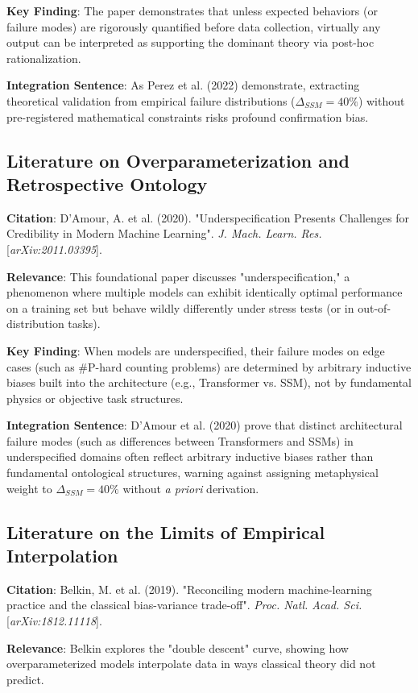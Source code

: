 \documentclass{article}
\begin{document}
\textbf{Key Finding}: The paper demonstrates that unless expected behaviors (or failure modes) are rigorously quantified before data collection, virtually any output can be interpreted as supporting the dominant theory via post-hoc rationalization.

\textbf{Integration Sentence}: As Perez et al. (2022) demonstrate, extracting theoretical validation from empirical failure distributions ($\Delta_{SSM} = 40\%$) without pre-registered mathematical constraints risks profound confirmation bias.

\subsection{Literature on Overparameterization and Retrospective Ontology}
\textbf{Citation}: D'Amour, A. et al. (2020). "Underspecification Presents Challenges for Credibility in Modern Machine Learning". \textit{J. Mach. Learn. Res.} [\textit{arXiv:2011.03395}].

\textbf{Relevance}: This foundational paper discusses "underspecification," a phenomenon where multiple models can exhibit identically optimal performance on a training set but behave wildly differently under stress tests (or in out-of-distribution tasks).

\textbf{Key Finding}: When models are underspecified, their failure modes on edge cases (such as \#P-hard counting problems) are determined by arbitrary inductive biases built into the architecture (e.g., Transformer vs. SSM), not by fundamental physics or objective task structures.

\textbf{Integration Sentence}: D'Amour et al. (2020) prove that distinct architectural failure modes (such as differences between Transformers and SSMs) in underspecified domains often reflect arbitrary inductive biases rather than fundamental ontological structures, warning against assigning metaphysical weight to $\Delta_{SSM} = 40\%$ without \textit{a priori} derivation.

\subsection{Literature on the Limits of Empirical Interpolation}
\textbf{Citation}: Belkin, M. et al. (2019). "Reconciling modern machine-learning practice and the classical bias-variance trade-off". \textit{Proc. Natl. Acad. Sci.} [\textit{arXiv:1812.11118}].

\textbf{Relevance}: Belkin explores the "double descent" curve, showing how overparameterized models interpolate data in ways classical theory did not predict.
\end{document}
